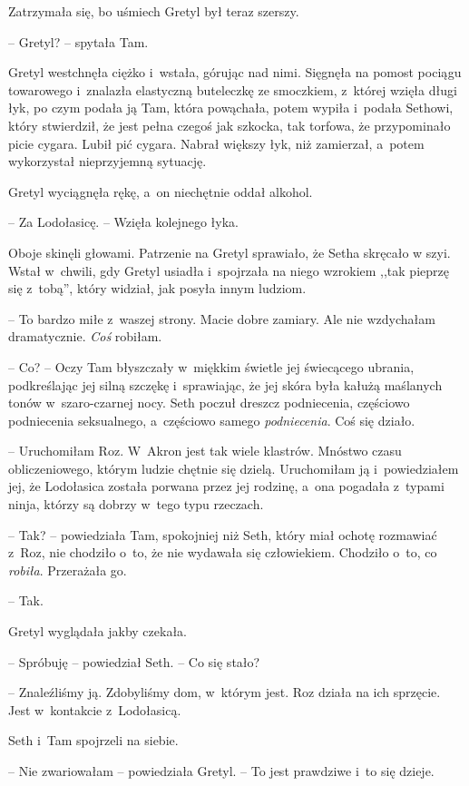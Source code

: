 \documentclass[oneside,polish,11pt,sfheadings]{mwbk}
\begin{document}
Zatrzymała się, bo uśmiech Gretyl był teraz szerszy. 

-- Gretyl? -- spytała
Tam.

Gretyl westchnęła ciężko i~wstała, górując nad nimi. Sięgnęła na pomost
pociągu towarowego i~znalazła elastyczną buteleczkę ze smoczkiem, z~której wzięła długi łyk, po czym podała ją Tam, która powąchała, potem
wypiła i~podała Sethowi, który stwierdził, że jest pełna czegoś jak
szkocka, tak torfowa, że przypominało picie cygara. Lubił pić cygara.
Nabrał większy łyk, niż zamierzał, a~potem wykorzystał nieprzyjemną
sytuację.

Gretyl wyciągnęła rękę, a~on niechętnie oddał alkohol. 

-- Za Lodołasicę. -- Wzięła kolejnego łyka.

Oboje skinęli głowami. Patrzenie na Gretyl sprawiało, że Setha skręcało
w szyi. Wstał w~chwili, gdy Gretyl usiadła i~spojrzała na niego wzrokiem
,,tak pieprzę się z~tobą'', który widział, jak posyła innym ludziom.

-- To bardzo miłe z~waszej strony. Macie dobre zamiary. Ale nie
wzdychałam dramatycznie. \textit{Coś} robiłam.

-- Co? -- Oczy Tam błyszczały w~miękkim świetle jej świecącego ubrania,
podkreślając jej silną szczękę i~sprawiając, że jej skóra była kałużą
maślanych tonów w~szaro-czarnej nocy. Seth poczuł dreszcz podniecenia,
częściowo podniecenia seksualnego, a~częściowo samego
\textit{podniecenia}. Coś się działo.

-- Uruchomiłam Roz. W~Akron jest tak wiele klastrów. Mnóstwo czasu
obliczeniowego, którym ludzie chętnie się dzielą. Uruchomiłam ją i~powiedziałem jej, że Lodołasica została porwana przez jej rodzinę, a~ona
pogadała z~typami ninja, którzy są dobrzy w~tego typu rzeczach.

-- Tak? -- powiedziała Tam, spokojniej niż Seth, który miał ochotę
rozmawiać z~Roz, nie chodziło o~to, że nie wydawała się człowiekiem.
Chodziło o~to, co \textit{robiła}. Przerażała go.

-- Tak.

Gretyl wyglądała jakby czekała.

-- Spróbuję -- powiedział Seth. -- Co się stało?

-- Znaleźliśmy ją. Zdobyliśmy dom, w~którym jest. Roz działa na ich
sprzęcie. Jest w~kontakcie z~Lodołasicą.

Seth i~Tam spojrzeli na siebie.

-- Nie zwariowałam -- powiedziała Gretyl. -- To jest prawdziwe i~to się
dzieje.
\end{document}
